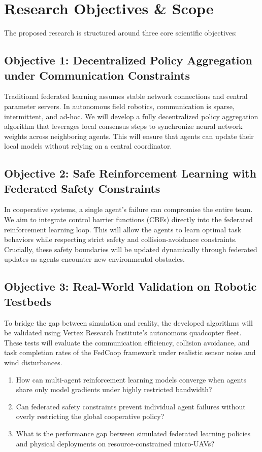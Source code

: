 \section{Research Objectives \& Scope}
The proposed research is structured around three core scientific objectives:

\subsection{Objective 1: Decentralized Policy Aggregation under Communication Constraints}
Traditional federated learning assumes stable network connections and central parameter servers. In autonomous field robotics, communication is sparse, intermittent, and ad-hoc. We will develop a fully decentralized policy aggregation algorithm that leverages local consensus steps to synchronize neural network weights across neighboring agents. This will ensure that agents can update their local models without relying on a central coordinator.

\subsection{Objective 2: Safe Reinforcement Learning with Federated Safety Constraints}
In cooperative systems, a single agent's failure can compromise the entire team. We aim to integrate control barrier functions (CBFs) directly into the federated reinforcement learning loop. This will allow the agents to learn optimal task behaviors while respecting strict safety and collision-avoidance constraints. Crucially, these safety boundaries will be updated dynamically through federated updates as agents encounter new environmental obstacles.

\subsection{Objective 3: Real-World Validation on Robotic Testbeds}
To bridge the gap between simulation and reality, the developed algorithms will be validated using Vertex Research Institute's autonomous quadcopter fleet. These tests will evaluate the communication efficiency, collision avoidance, and task completion rates of the FedCoop framework under realistic sensor noise and wind disturbances.

\begin{tcolorbox}[colback=lightbg, colframe=primarycolor, title=Key Research Questions, fonttitle=\bfseries]
\begin{enumerate}[label=\bfseries Q\arabic*:, leftmargin=2.5em]
    \item How can multi-agent reinforcement learning models converge when agents share only model gradients under highly restricted bandwidth?
    \item Can federated safety constraints prevent individual agent failures without overly restricting the global cooperative policy?
    \item What is the performance gap between simulated federated learning policies and physical deployments on resource-constrained micro-UAVs?
\end{enumerate}
\end{tcolorbox}
